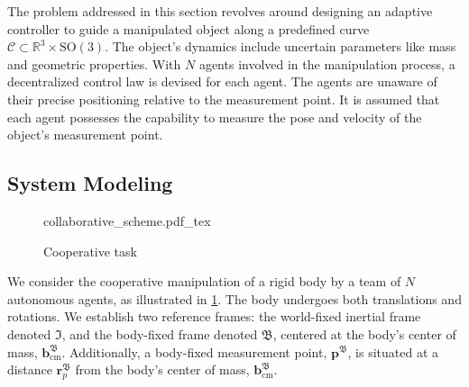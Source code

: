 The problem addressed in this section revolves around designing an adaptive controller to guide a manipulated object along a predefined curve $\mathcal{C} \subset \mathbb{R}^3\times \text{SO}(3)$. The object's dynamics include uncertain parameters like mass and geometric properties. With $N$ agents involved in the manipulation process, a decentralized control law is devised for each agent. The agents are unaware of their precise positioning relative to the measurement point. It is assumed that each agent possesses the capability to measure the pose and velocity of the object's measurement point.

\vspace{-1mm}
\subsection{System Modeling}
\vspace{-1mm}
\begin{figure}[ht]
    \centering
    \def\svgwidth{.8\linewidth}
    {collaborative_scheme.pdf_tex}
    \caption{Cooperative task}
    \label{fig:problem}
\end{figure}
We consider the cooperative manipulation of a rigid body by a team of $N$ autonomous agents, as illustrated in \cref{fig:problem}. The body undergoes both translations and rotations. We establish two reference frames: the world-fixed inertial frame denoted $\mathfrak{I}$, and the body-fixed frame denoted $\mathfrak{B}$, centered at the body's center of mass, $\mathbf{b}_\text{cm}^\mathfrak{B}$. Additionally, a body-fixed measurement point, $\mathbf{p}^\mathfrak{B}$, is situated at a distance $\mathbf{r}_p^\mathfrak{B}$ from the body's center of mass, $\mathbf{b}_\text{cm}^\mathfrak{B}$.

